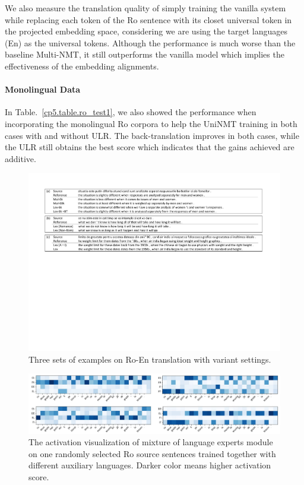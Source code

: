 We also measure the translation quality of simply training the vanilla system while replacing each  token of the Ro sentence with its closet universal token in the projected embedding space, considering we are using the target languages (En) as the universal tokens. Although the performance is much worse than the baseline Multi-NMT, it still outperforms the vanilla model which implies the effectiveness of the embedding alignments.

\paragraph{Monolingual Data}
In Table.~\ref{cp5.table.ro_test1},  we also showed the performance when incorporating the monolingual Ro corpora to help the UniNMT training in both cases with and without ULR. The back-translation improves in both cases, while the  ULR  still obtains the best score  which indicates that the gains achieved are additive.

\begin{figure}[t]
\centering
\includegraphics[width=\linewidth]{figs/ulr/examples1} \vspace{-10pt}
\caption{\label{cp5.fig.exp}Three sets of examples on Ro-En translation with variant settings. }
\end{figure}
\begin{figure}[t]
\centering
\includegraphics[width=\linewidth]{figs/ulr/vis2}\vspace{-10pt}
\caption{\label{cp5.fig.moe} The activation visualization of mixture of language experts module on one randomly selected Ro source sentences trained together with different auxiliary languages. Darker color means higher activation score. }
\end{figure}

